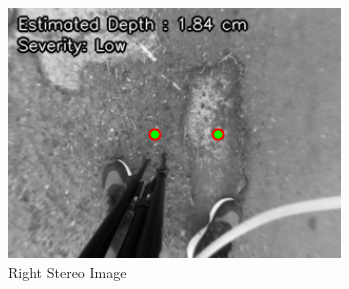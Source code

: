 \begin{figure}[htbp]
\begin{minipage}{0.32\textwidth}
		\includegraphics[width=\textwidth]{pothole raw right.png}
		\caption{Right Stereo Image}
		\label{fig:image3}
	\end{minipage}
\end{figure}

%

